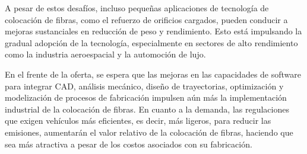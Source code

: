 
A pesar de estos desafíos, incluso pequeñas aplicaciones de tecnología de colocación de fibras, como el refuerzo de orificios cargados, pueden conducir a mejoras sustanciales en reducción de peso y rendimiento. Esto está impulsando la gradual adopción de la tecnología, especialmente en sectores de alto rendimiento como la industria aeroespacial y la automoción de lujo.

En el frente de la oferta, se espera que las mejoras en las capacidades de software para integrar CAD, análisis mecánico, diseño de trayectorias, optimización y modelización de procesos de fabricación impulsen aún más la implementación industrial de la colocación de fibras. En cuanto a la demanda, las regulaciones que exigen vehículos más eficientes, es decir, más ligeros, para reducir las emisiones, aumentarán el valor relativo de la colocación de fibras, haciendo que sea más atractiva a pesar de los costos asociados con su fabricación.

\textbf{}